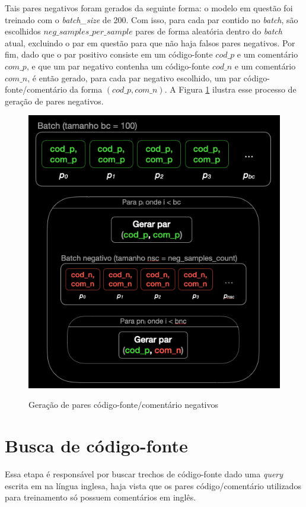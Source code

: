 Tais pares negativos foram gerados da seguinte forma: o modelo em questão foi treinado com o \textit{batch\_size} de 200. Com isso, para cada par contido no \textit{batch}, são escolhidos $neg\_samples\_per\_sample$ pares de forma aleatória dentro do \textit{batch} atual, excluindo o par em questão para que não haja falsos pares negativos. Por fim, dado que o par positivo consiste em um código-fonte $cod\_p$ e um comentário $com\_p$, e que um par negativo contenha um código-fonte $cod\_n$ e um comentário $com\_n$, é então gerado, para cada par negativo escolhido, um par código-fonte/comentário da forma $(cod\_p, com\_n)$. A Figura \ref{fig:metodology-neg_samples_gen_diagram} ilustra esse processo de geração de pares negativos.

\begin{figure}[H]
    \centering
        \caption{Geração de pares código-fonte/comentário negativos}
        \includegraphics[scale=0.7]{neg_samples_gen.png}
        \label{fig:metodology-neg_samples_gen_diagram}
\end{figure}

\section{Busca de código-fonte}
Essa etapa é responsável por buscar trechos de código-fonte dado uma \textit{query} escrita em na língua inglesa, haja vista que os pares código/comentário utilizados para treinamento só possuem comentários em inglês.

